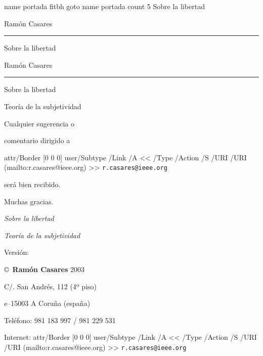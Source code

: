 

\ifx\pdfliteral\undefined\else
 \begingroup\corkfont
 \endgroup
\fi


\pdfcode
\pdfdest name {portada} fitbh
\pdfoutline goto name {portada} count 5 {Sobre la libertad}
\pdfendcode


\centerline{\fontone Ramón Casares}
\vskip1pc
\hrule height 1pt
\vskip1.5pc
\centerline{\fontzero Sobre la libertad}

\vfill\break %

\null

\vfill\break %

\centerline{\fontone Ramón Casares}
\vskip1pc
\hrule height 1pt
\vskip1.5pc
\centerline{\fontzero Sobre la libertad}
\vskip1pc
\centerline{\fontone Teoría de la subjetividad}

\vfill\break %

\null \vfill

 Cualquier sugerencia o\par comentario dirigido a\par
 \indent\pdfcode \pdfstartlink attr{/Border [0 0 0]}
   user{/Subtype /Link /A << /Type /Action
    /S /URI /URI (mailto:r.casares@ieee.org) >>}\pdfendcode
  {\tt r.casares@ieee.org}\pdfcode \pdfendlink \pdfendcode\par
 será bien recibido.\par
 Muchas gracias.

\vglue 2pc

 \def\smallcaps#1{{\sc\lowercase{#1}}}

 {\sl Sobre la libertad}\par
 {\sl Teoría de la subjetividad}\par
 Versión: \todayiso \par
 \copyright\ {\bf Ramón Casares} 2003\par
 C/. San Andrés, 112 (4º piso)\par
 \smallcaps E--15003 A Coruña (\smallcaps{ESPAÑA})\par
 Teléfono: 981 183 997 / 981 229 531\par
 Internet: \pdfcode \pdfstartlink attr{/Border [0 0 0]}
   user{/Subtype /Link /A << /Type /Action
    /S /URI /URI (mailto:r.casares@ieee.org) >>}\pdfendcode
  {\tt r.casares@ieee.org}\pdfcode \pdfendlink \pdfendcode \par

\break %


\null
\vfil
\rightline{[Dedicatoria]}
\vfil
\rightline{[Agradecimientos]}
\vfil
\break %

\null\vfill\break %

\endinput
